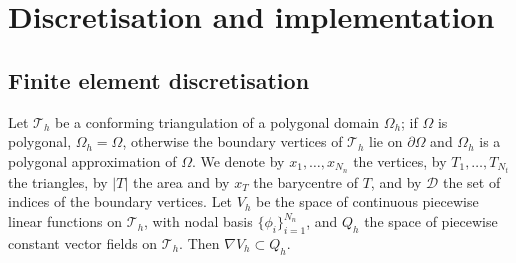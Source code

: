 \documentclass[11pt]{amsart}
\newcommand{\T}{\mathcal T}
\theoremstyle{definition}
\theoremstyle{remark}
\numberwithin{equation}{section}
\begin{document}
\section{Discretisation and implementation}\label{sec.implementation}

\subsection{Finite element discretisation}
Let $\T_h$ be a conforming triangulation of a polygonal domain $\Omega_h$; if $\Omega$ is polygonal, $\Omega_h=\Omega$, otherwise the boundary vertices of $\T_h$ lie on $\partial\Omega$ and $\Omega_h$ is a polygonal approximation of $\Omega$. We denote by $x_1,\dots,x_{N_n}$ the vertices, by $T_1,\dots,T_{N_t}$ the triangles, by $|T|$ the area and by $x_T$ the barycentre of $T$, and by $\mathcal D$ the set of indices of the boundary vertices. Let $V_h$ be the space of continuous piecewise linear functions on $\T_h$, with nodal basis $\{\phi_i\}_{i=1}^{N_n}$, and $Q_h$ the space of piecewise constant vector fields on $\T_h$. Then $\nabla V_h\subset Q_h$.
\end{document}
